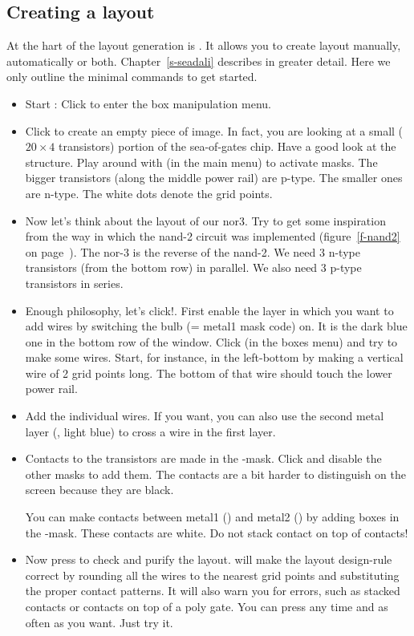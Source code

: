 \subsection{Creating a layout}
At the hart of the layout generation is . 
It allows you to create
layout manually, automatically or both.  Chapter~\ref{s-seadali} describes
 in greater detail. Here we only outline the minimal commands to
get started.
\begin{itemize}
\item
{}
Start :  
Click  to enter the box manipulation menu. 
\item
Click  to create an empty piece of image. In fact,
you are looking at a small ($20 \times 4$ transistors) portion of
the sea-of-gates chip. Have a good look at the structure. Play around
with  (in the main menu) to activate masks. The
bigger transistors (along the middle power rail) are p-type. The
smaller ones are n-type. The white dots denote the grid points.
\item
Now let's think about the layout of our nor3. Try to get some inspiration from
the way in which the nand-2 circuit was implemented (figure~\ref{f-nand2} on
page~\pageref{f-nand2}). The nor-3 is the reverse of the nand-2.  We need 3
n-type transistors (from the bottom row) in parallel. We also need 3 p-type
transistors in series.
\item
Enough philosophy, let's click!. First enable the layer in which you
want to add wires by switching the bulb  (= metal1 mask
code) on. It is the dark blue one in the bottom row of the window. 
Click  (in the boxes menu) and try to make some wires.
Start, for instance, in the left-bottom by making a vertical wire of
2 grid points long. The bottom of that wire should touch the lower
power rail.

\item
Add the individual wires. If you want, you can also use the second
metal layer (, light blue) to cross a wire in 
the first layer.
\item
Contacts to the transistors are made in the -mask. 
Click
 and disable the other masks to add them. The contacts
are a bit harder to distinguish on the screen because they are black.

You can make contacts between metal1 () and metal2
() by adding boxes in the -mask. These contacts
are white. Do not stack  contact on top of 
contacts!
\item
Now press  to check and purify the layout.
 will make the layout design-rule correct by rounding all
the wires to the nearest grid points and substituting the proper
contact patterns. It will also warn you for errors, such as stacked
contacts or  contacts on top of a poly gate. You can press
 any time and as often as you want. Just try it.


\end{itemize}
